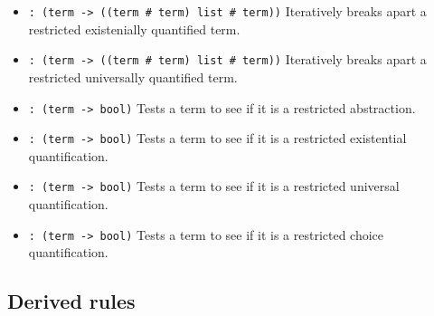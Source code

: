 \documentclass[12pt]{article}
\begin{document}
\begin{itemize}
\item {} \verb|: (term -> ((term # term) list # term))|\newline
Iteratively breaks apart a restricted existenially quantified term.

\item {} \verb|: (term -> ((term # term) list # term))|\newline
Iteratively breaks apart a restricted universally quantified term.

\item {} \verb|: (term -> bool)|\newline
Tests a term to see if it is a restricted abstraction.

\item {} \verb|: (term -> bool)|\newline
Tests a term to see if it is a restricted existential quantification.

\item {} \verb|: (term -> bool)|\newline
Tests a term to see if it is a restricted universal quantification.

\item {} \verb|: (term -> bool)|\newline
Tests a term to see if it is a restricted choice quantification.
\end{itemize}

\subsection*{Derived rules}
\end{document}
